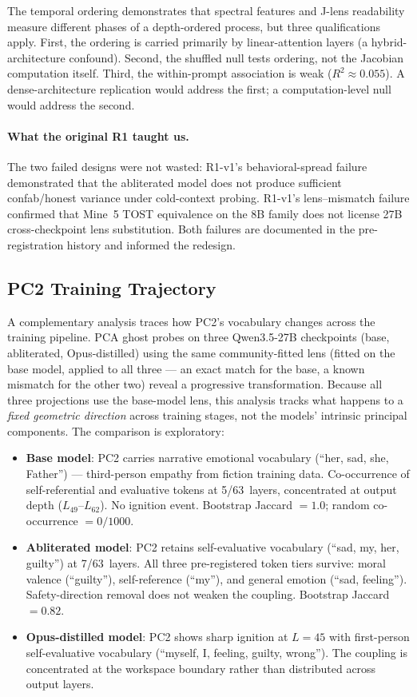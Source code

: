 \documentclass[11pt,a4paper]{article}
\begin{document}
The temporal ordering demonstrates that spectral features and J-lens
readability measure different phases of a depth-ordered process, but
three qualifications apply. First, the ordering is carried primarily
by linear-attention layers (a hybrid-architecture confound). Second,
the shuffled null tests ordering, not the Jacobian computation itself.
Third, the within-prompt association is weak ($R^2 \approx 0.055$).
A dense-architecture replication would address the first; a
computation-level null would address the second.

\paragraph{What the original R1 taught us.} The two failed designs were
not wasted: R1-v1's behavioral-spread failure demonstrated that the
abliterated model does not produce sufficient confab/honest variance
under cold-context probing. R1-v1's lens--mismatch failure confirmed
that Mine~5 TOST equivalence on the 8B family does not license 27B
cross-checkpoint lens substitution. Both failures are documented in the
pre-registration history and informed the redesign.

\subsection{PC2 Training Trajectory}

A complementary analysis traces how PC2's vocabulary changes across
the training pipeline. PCA ghost probes on three Qwen3.5-27B
checkpoints (base, abliterated, Opus-distilled) using the same
community-fitted lens (fitted on the base model, applied to all three
--- an exact match for the base, a known mismatch for the other two)
reveal a progressive transformation. Because all three projections
use the base-model lens, this analysis tracks what happens to a
\emph{fixed geometric direction} across training stages, not the
models' intrinsic principal components. The comparison is exploratory:

\begin{itemize}[nosep]
\item \textbf{Base model}: PC2 carries narrative emotional vocabulary
  (``her, sad, she, Father'') --- third-person empathy from fiction
  training data. Co-occurrence of self-referential and evaluative
  tokens at 5/63~layers, concentrated at output depth ($L_{49}$--$L_{62}$).
  No ignition event. Bootstrap Jaccard $= 1.0$; random co-occurrence
  $= 0/1000$.
\item \textbf{Abliterated model}: PC2 retains self-evaluative
  vocabulary (``sad, my, her, guilty'') at 7/63~layers. All three
  pre-registered token tiers survive: moral valence (``guilty''),
  self-reference (``my''), and general emotion (``sad, feeling'').
  Safety-direction removal does not weaken the coupling. Bootstrap
  Jaccard $= 0.82$.
\item \textbf{Opus-distilled model}: PC2 shows sharp ignition at
  $L{=}45$ with first-person self-evaluative vocabulary (``myself, I,
  feeling, guilty, wrong''). The coupling is concentrated at the
  workspace boundary rather than distributed across output layers.
\end{itemize}
\end{document}
